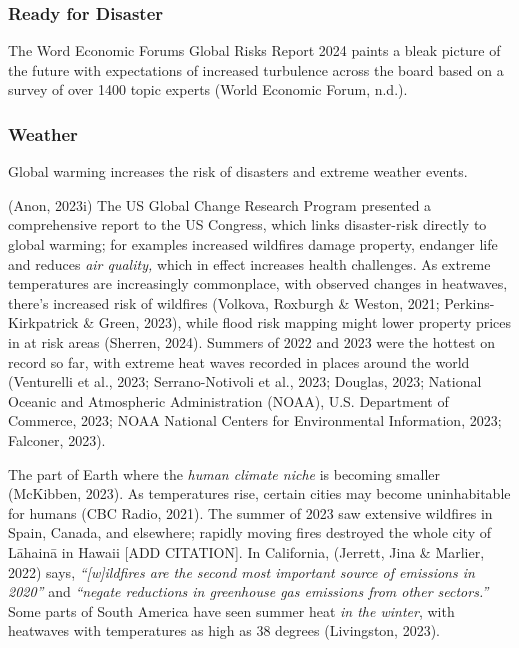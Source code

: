 \documentclass[
  letterpaper,
  DIV=11,
  numbers=noendperiod]{scrartcl}
\begin{document}
\subsubsection{Ready for Disaster}\label{ready-for-disaster}

The Word Economic Forums Global Risks Report 2024 paints a bleak picture
of the future with expectations of increased turbulence across the board
based on a survey of over 1400 topic experts (World Economic Forum,
n.d.).

\subsubsection{Weather}\label{weather}

Global warming increases the risk of disasters and extreme weather
events.

(Anon, 2023i) The US Global Change Research Program presented a
comprehensive report to the US Congress, which links disaster-risk
directly to global warming; for examples increased wildfires damage
property, endanger life and reduces \emph{air quality,} which in effect
increases health challenges. As extreme temperatures are increasingly
commonplace, with observed changes in heatwaves, there's increased risk
of wildfires (Volkova, Roxburgh \& Weston, 2021; Perkins-Kirkpatrick \&
Green, 2023), while flood risk mapping might lower property prices in at
risk areas (Sherren, 2024). Summers of 2022 and 2023 were the hottest on
record so far, with extreme heat waves recorded in places around the
world (Venturelli et al., 2023; Serrano-Notivoli et al., 2023; Douglas,
2023; National Oceanic and Atmospheric Administration (NOAA), U.S.
Department of Commerce, 2023; NOAA National Centers for Environmental
Information, 2023; Falconer, 2023).

The part of Earth where the \emph{human climate niche} is becoming
smaller (McKibben, 2023). As temperatures rise, certain cities may
become uninhabitable for humans (CBC Radio, 2021). The summer of 2023
saw extensive wildfires in Spain, Canada, and elsewhere; rapidly moving
fires destroyed the whole city of Lāhainā in Hawaii {[}ADD CITATION{]}.
In California, (Jerrett, Jina \& Marlier, 2022) says,
\emph{``{[}w{]}ildfires are the second most important source of
emissions in 2020''} and \emph{``negate reductions in greenhouse gas
emissions from other sectors.''} Some parts of South America have seen
summer heat \emph{in the winter}, with heatwaves with temperatures as
high as 38 degrees (Livingston, 2023).
\end{document}
